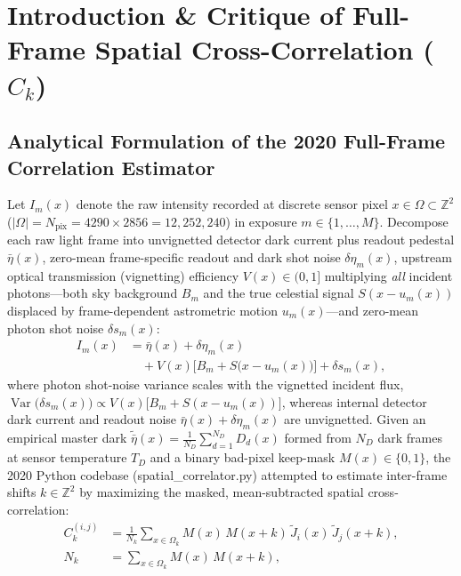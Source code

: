 \documentclass[10pt,twocolumn,letterpaper]{article}
\DeclareRobustCommand{\code}[1]{\texttt{#1}}
\def\code#1{#1}%
\def\bm#1{#1}%
\def\allowbreak{}%
\begin{document}
\section{Introduction \& Critique of Full-Frame Spatial Cross-Correlation (\texorpdfstring{$C_{\bm{k}}$}{Ck})}
\label{sec:intro}

\subsection{Analytical Formulation of the 2020 Full-Frame Correlation Estimator}

Let $I_m(\bm{x})$ denote the raw intensity recorded at discrete sensor pixel $\bm{x} \in \Omega \subset \mathbb{Z}^2$ ($|\Omega| = N_{\text{pix}} = 4290 \times 2856 = 12{,}252{,}240$) in exposure $m \in \{1, \dots, M\}$. Decompose each raw light frame into unvignetted detector dark current plus readout pedestal $\bar{\eta}(\bm{x})$, zero-mean frame-specific readout and dark shot noise $\delta\eta_m(\bm{x})$, upstream optical transmission (vignetting) efficiency $V(\bm{x}) \in (0, 1]$ multiplying \emph{all} incident photons---both sky background $B_m$ and the true celestial signal $S(\bm{x} - \bm{u}_m(\bm{x}))$ displaced by frame-dependent astrometric motion $\bm{u}_m(\bm{x})$---and zero-mean photon shot noise $\delta s_m(\bm{x})$:
\begin{equation}
  \begin{aligned}
    I_m(\bm{x}) &= \bar{\eta}(\bm{x}) + \delta\eta_m(\bm{x}) \\
                &\quad + V(\bm{x})\Big[B_m + S\big(\bm{x} - \bm{u}_m(\bm{x})\big)\Big] + \delta s_m(\bm{x}),
  \end{aligned}
  \label{eq:raw_model}
\end{equation}
where photon shot-noise variance scales with the vignetted incident flux, $\operatorname{Var}\big(\delta s_m(\bm{x})\big) \propto V(\bm{x})\big[B_m + S(\bm{x} - \bm{u}_m(\bm{x}))\big]$, whereas internal detector dark current and readout noise $\bar{\eta}(\bm{x}) + \delta\eta_m(\bm{x})$ are unvignetted. Given an empirical master dark $\tilde{\bar{\eta}}(\bm{x}) = \frac{1}{N_D} \sum_{d=1}^{N_D} D_d(\bm{x})$ formed from $N_D$ dark frames at sensor temperature $T_D$ and a binary bad-pixel keep-mask $M(\bm{x}) \in \{0, 1\}$, the 2020 Python codebase (\code{spatial\_\allowbreak correlator.py}) attempted to estimate inter-frame shifts $\bm{k} \in \mathbb{Z}^2$ by maximizing the masked, mean-subtracted spatial cross-correlation:
\begin{equation}
  \begin{aligned}
    C_{\bm{k}}^{(i,j)} &= \frac{1}{N_{\bm{k}}} \sum_{\bm{x} \in \Omega_{\bm{k}}} M(\bm{x})\,M(\bm{x}+\bm{k})\,\tilde{J}_i(\bm{x})\,\tilde{J}_j(\bm{x}+\bm{k}), \\
    N_{\bm{k}} &= \sum_{\bm{x} \in \Omega_{\bm{k}}} M(\bm{x})\,M(\bm{x}+\bm{k}),
  \end{aligned}
  \label{eq:spatial_corr}
\end{equation}
\end{document}
